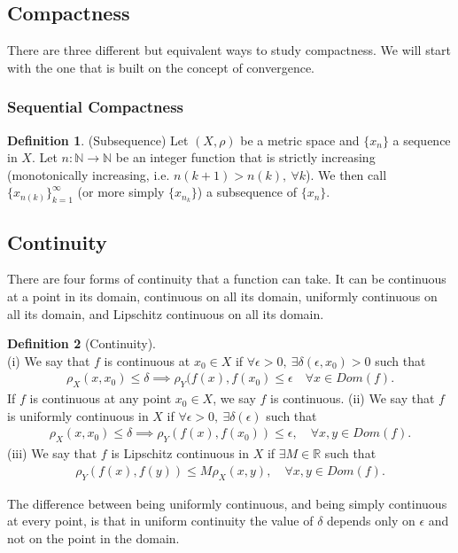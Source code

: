 \documentclass{article}
\numberwithin{theorem}{subsection}
\numberwithin{theorem}{subsubsection}
\numberwithin{lemma}{subsection}
\numberwithin{lemma}{subsubsection}
\theoremstyle{definition}
\newtheorem{definition}{Definition}[section]
\numberwithin{definition}{subsection}
\numberwithin{definition}{subsubsection}
\begin{document}
\subsection{Compactness}
There are three different but equivalent ways to study compactness. We will start with the one that is built on the concept of convergence.

\subsubsection{Sequential Compactness}
\begin{definition}(Subsequence)
    Let $(X,\rho)$ be a metric space and $\{x_{n}\}$ a sequence in $X$. Let $n: \mathbb{N} \rightarrow\mathbb{N}$ be an integer function that is strictly increasing (monotonically increasing, i.e. $n(k+1) > n(k),\ \forall k$). We then call $\{x_{n(k)}\}_{k=1}^{\infty}$ (or more simply $\{x_{n_{k}}\}$) a subsequence of $\{x_{n}\}$.
\end{definition}
\subsection{Continuity}
There are four forms of continuity that a function can take. It can be continuous at a point in its domain, continuous on all its domain, uniformly continuous on all its domain, and Lipschitz continuous on all its domain.
\begin{definition}[Continuity]\ \\
    (i) We say that $f$ is continuous at $x_{0} \in X$ if $\forall \epsilon > 0,\ \exists \delta(\epsilon,x_{0}) > 0$ such that
    \begin{gather}
        \rho_{X}(x,x_{0}) \leq \delta \implies \rho_{Y}(f(x),f(x_{0}) \leq \epsilon \quad \forall x \in Dom(f).
    \end{gather}
    If $f$ is continuous at any point $x_{0} \in X$, we say $f$ is continuous.
    (ii) We say that $f$ is uniformly continuous in $X$ if $\forall \epsilon > 0,\ \exists \delta(\epsilon)$ such that
    \begin{gather}
        \rho_{X}(x,x_{0}) \leq \delta \implies \rho_{Y}(f(x),f(x_{0})) \leq \epsilon, \quad \forall x,y\in Dom(f).
    \end{gather}
    (iii) We say that $f$ is Lipschitz continuous in $X$ if $\exists M \in \mathbb{R}$ such that
    \begin{gather}
        \rho_{Y}(f(x),f(y)) \leq M\rho_{X}(x,y), \quad \forall x,y \in Dom(f).
    \end{gather}
    
    The difference between being uniformly continuous, and being simply continuous at every point, is that in uniform continuity the value of $\delta$ depends only on $\epsilon$ and not on the point in the domain.
\end{definition}
\end{document}
